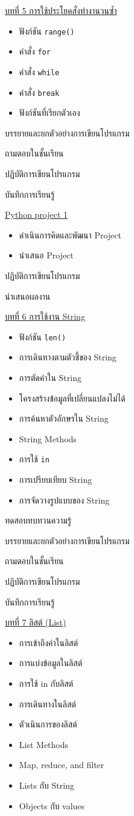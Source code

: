 {
\underline{บทที่ 5 การใช้ประโยคสั่งทำงานวนซ้ำ}
\begin{itemize}
\item ฟังก์ชัน \texttt{range()}
\item คำสั่ง \texttt{for}
\item คำสั่ง \texttt{while}
\item คำสั่ง \texttt{break}
\item ฟังก์ชันที่เรียกตัวเอง
\end{itemize}

}
{
\item  บรรยายและยกตัวอย่างการเขียนโปรแกรม
\item  ถามตอบในชั้นเรียน
\item  ปฏิบัติการเขียนโปรแกรม
\item  บันทึกการเรียนรู้
}
{
\underline{Python project 1}
\begin{itemize}
\item ดำเนินการคิดและพัฒนา Project
\item นำเสนอ Project
\end{itemize}
}
{
\item  ปฏิบัติการเขียนโปรแกรม
\item  นำเสนอผลงาน
}
{
\underline{บทที่ 6 การใช้งาน String}
\begin{itemize}
\item ฟังก์ชัน \texttt{len()}
\item การเดินทางตามตัวชี้ของ String
\item การตัดคำใน String
\item โครงสร้างข้อมูลที่เปลี่ยนแปลงไม่ได้
\item การค้นหาตัวอักษรใน String
\item String Methods
\item การใช้  \texttt{in}
\item การเปรียบเทียบ String
\item การจัดวางรูปแบบของ String

\end{itemize}

}
{
\item ทดสอบทบทวนความรู้
\item  บรรยายและยกตัวอย่างการเขียนโปรแกรม
\item  ถามตอบในชั้นเรียน
\item  ปฏิบัติการเขียนโปรแกรม
\item  บันทึกการเรียนรู้
}
{
\underline{บทที่ 7 ลิสต์ (List)}
\begin{itemize}
\item การเข้าถึงค่าในลิสต์
\item การแบ่งข้อมูลในลิสต์
\item การใช้ in กับลิสต์
\item การเดินทางในลิสต์
\item ตัวเนินการของลิสต์
\item List Methods
\item Map, reduce, and filter
\item Lists กับ String
\item Objects กับ values
\end{itemize}
}
